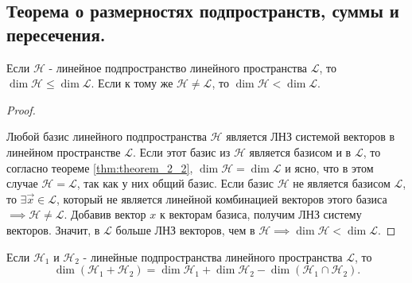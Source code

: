 \subsection{
    Теорема о размерностях подпространств, суммы и пересечения.
}

\begin{theorem}
    Если $\mathcal{H}$ - линейное подпространство линейного пространства $\mathcal{L}$, то $\dim \mathcal{H} \leq \dim \mathcal{L}$. Если к тому же $\mathcal{H} \ne \mathcal{L}$, то $\dim \mathcal{H} < \dim \mathcal{L}$.
\end{theorem}

\begin{proof}~

    Любой базис линейного подпространства $\mathcal{H}$ является ЛНЗ системой векторов в линейном пространстве $\mathcal{L}$. Если этот базис из $\mathcal{H}$ является базисом и в $\mathcal{L}$, то согласно теореме \eqref{thm:theorem_2_2}, $\dim \mathcal{H} = \dim \mathcal{L}$ и ясно, что в этом случае $\mathcal{H} = \mathcal{L}$, так как у них общий базис. Если базис $\mathcal{H}$ не является базисом $\mathcal{L}$, то $\exists \vec{x} \in \mathcal{L}$, который не является линейной комбинацией векторов этого базиса $\implies \mathcal{H} \ne \mathcal{L}$. Добавив вектор $x$ к векторам базиса, получим ЛНЗ систему векторов. Значит, в $\mathcal{L}$ больше ЛНЗ векторов, чем в $\mathcal{H} \implies \dim \mathcal{H} < \dim \mathcal{L}$.
\end{proof}

\begin{theorem}
    Если $\mathcal{H}_1$ и $\mathcal{H}_2$ - линейные подпространства линейного пространства $\mathcal{L}$, то
    $$\dim(\mathcal{H}_1 + \mathcal{H}_2) = \dim\mathcal{H}_1 + \dim\mathcal{H}_2 - \dim(\mathcal{H}_1 \cap \mathcal{H}_2).$$
    \label{thm:theorem_4_6}
\end{theorem}

